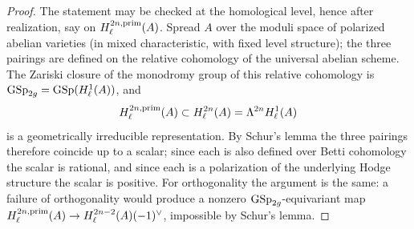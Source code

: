 \begin{proof}
  The statement may be checked at the homological level, hence after
  realization, say on \(H_\ell^{2n,\mathrm{prim}}(A)\). Spread \(A\) over the moduli
  space of polarized abelian varieties (in mixed characteristic, with fixed
  level structure); the three pairings are defined on the relative cohomology of
  the universal abelian scheme. The Zariski closure of the monodromy group of
  this relative cohomology is \(\mathrm{GSp}_{2g} = \mathrm{GSp}(H_\ell^{1}(A))\), and
  \[H_\ell^{2n,\mathrm{prim}}(A) \subset H_\ell^{2n}(A) = \Lambda^{2n} H_\ell^{1}(A)\]
  is a geometrically irreducible representation. By Schur's lemma the three
  pairings therefore coincide up to a scalar; since each is also defined over
  Betti cohomology the scalar is rational, and since each is a polarization of
  the underlying Hodge structure the scalar is positive. For orthogonality the
  argument is the same: a failure of orthogonality would produce a nonzero
  \(\mathrm{GSp}_{2g}\)-equivariant map
  \(H_\ell^{2n,\mathrm{prim}}(A) \to H_\ell^{2n-2}(A)(-1)^\vee\), impossible by Schur's
  lemma.
\end{proof}

